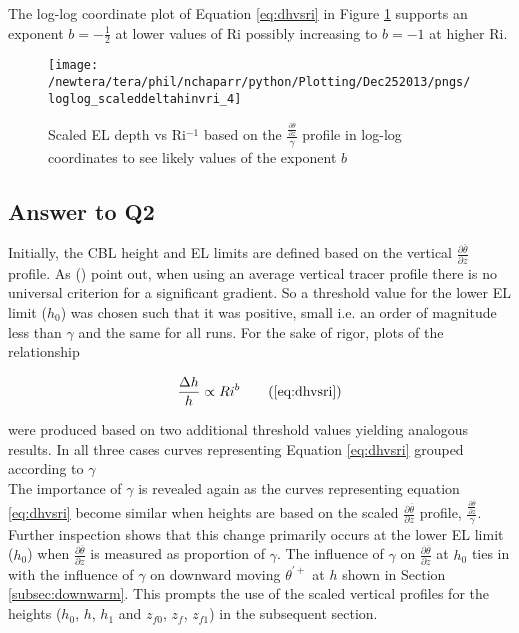 The log-log coordinate plot of Equation \ref{eq:dhvsri} in Figure \ref{fig:loglogdeltahinvri} supports an exponent $b = -\frac{1}{2}$ at lower values of \acs{Ri} possibly increasing to $b = -1$ at higher \acs{Ri}.\\    

\begin{figure}[htbp]
\centering
\texttt{[image: /newtera/tera/phil/nchaparr/python/Plotting/Dec252013/pngs/loglog\_scaleddeltahinvri\_4]}\\
\caption[Log-log plot of scaled \acs{EL} depth vs \acs{Ri}$^{-1}$]{Scaled \acs{EL} depth vs \acs{Ri}$^{-1}$ based on the $\frac{\frac{\partial \overline{\theta}}{\partial z}}{\gamma}$ profile in log-log coordinates to see likely values of the exponent $b$}
\label{fig:loglogdeltahinvri}
\end{figure}

\subsection{Answer to Q2}

Initially, the \acs{CBL} height and \acs{EL} limits are defined based on the vertical  $\frac{\partial \overline{\theta}}{\partial z}$ profile.  As \citeauthor{BrooksFowler2} (\citeyear{BrooksFowler2}) point out, when using an average vertical tracer profile there is no universal criterion for a significant gradient.  So a threshold value for the lower \acs{EL} limit ($h_{0}$) was chosen such that it was positive, small i.e. an order of magnitude less than $\gamma$ and the same for all runs.  For the sake of rigor, plots of the relationship

\begin{equation}
\frac{\Delta h}{h} \propto Ri ^{b} \tag{\ref{eq:dhvsri}}
\end{equation}

were produced based on two additional threshold values yielding analogous results.  In all three cases curves representing Equation \ref{eq:dhvsri} grouped according to $\gamma$\\

The importance of $\gamma$ is revealed again as the curves representing equation \ref{eq:dhvsri} become similar when heights are based on the scaled $\frac{\partial \overline{\theta}}{\partial z}$ profile, $\frac{\frac{\partial \overline{\theta}}{\partial z}}{\gamma}$. Further inspection shows that this change primarily occurs at the lower \acs{EL} limit ($h_{0}$) when $\frac{\partial \overline{\theta}}{\partial z}$ is measured as proportion of $\gamma$. The influence of $\gamma$ on $\frac{\partial \overline{\theta}}{\partial z}$ at $h_{0}$ ties in with the influence of $\gamma$ on downward moving $\theta^{'+}$ at $h$ shown in Section \ref{subsec:downwarm}.  This prompts the use of the scaled vertical profiles for the heights ($h_{0}$, $h$, $h_{1}$ and $z_{f0}$, $z_{f}$, $z_{f1}$) in the subsequent section.\\

